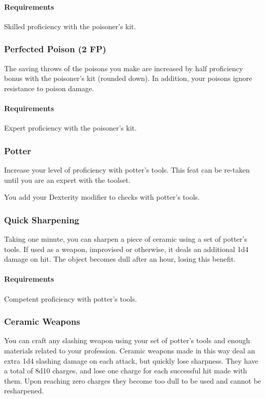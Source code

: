     \paragraph{Requirements} Skilled proficiency with the poisoner's kit.
\subsubsection{Perfected Poison (2 FP)} \label{feat::perfectedpoison}
    The saving throws of the poisons you make are increased by half proficiency bonus with the poisoner's kit (rounded down).
    In addition, your poisons ignore resistance to poison damage.
    \paragraph{Requirements} Expert proficiency with the poisoner's kit.

\subsubsection{Potter} \label{feat::potter}
    Increase your level of proficiency with potter's tools.
    This feat can be re-taken until you are an expert with the toolset.

    You add your Dexterity modifier to checks with potter's tools.
\subsubsection{Quick Sharpening} \label{feat::quicksharpening}
    Taking one minute, you can sharpen a piece of ceramic using a set of potter's tools.
    If used as a weapon, improvised or otherwise, it deals an additional 1d4 damage on hit.
    The object becomes dull after an hour, losing this benefit.
    \paragraph{Requirements} Competent proficiency with potter's tools.
\subsubsection{Ceramic Weapons} \label{feat::ceramicweapons}
    You can craft any slashing weapon using your set of potter's tools and enough materials related to your profession.
    Ceramic weapons made in this way deal an extra 1d4 slashing damage on each attack, but quickly lose sharpness.
    They have a total of 8d10 charges, and lose one charge for each successful hit made with them.
    Upon reaching zero charges they become too dull to be used and cannot be resharpened.
